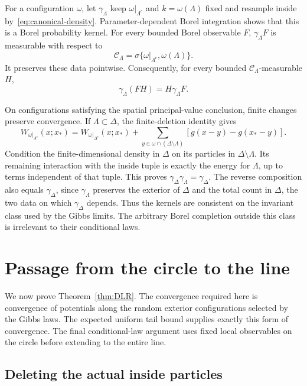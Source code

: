 \documentclass[11pt]{article}
\theoremstyle{remark}\newtheorem{remark}[theorem]{Remark}
\begin{document}
For a configuration $\omega$, let $\gamma_\Lambda$ keep
$\omega|_{\Lambda^c}$ and $k=\omega(\Lambda)$ fixed and resample
inside by~\eqref{eq:canonical-density}. Parameter-dependent Borel
integration shows that this is a Borel probability kernel. For
every bounded Borel observable $F$, $\gamma_\Lambda F$ is
measurable with respect to
\begin{equation}\label{eq:canonical-sigma}
 \mathcal C_\Lambda
   =\sigma\{\omega|_{\Lambda^c},\omega(\Lambda)\}.
\end{equation}
It preserves these data pointwise. Consequently, for every bounded
$\mathcal C_\Lambda$-measurable $H$,
\begin{equation}\label{eq:properness}
 \gamma_\Lambda(FH)=H\gamma_\Lambda F.
\end{equation}

On configurations satisfying the spatial principal-value conclusion,
finite changes preserve convergence. If $\Lambda\subset\Delta$,
the finite-deletion identity gives
\[
 W_{\omega|_{\Lambda^c}}(x;x_*)
 =W_{\omega|_{\Delta^c}}(x;x_*)
    +\sum_{y\in\omega\cap(\Delta\setminus\Lambda)}
            [g(x-y)-g(x_*-y)].
\]
Condition the finite-dimensional density in $\Delta$ on its
particles in $\Delta\setminus\Lambda$. Its remaining interaction
with the inside tuple is exactly the energy for $\Lambda$, up to
terms independent of that tuple. This proves
$\gamma_\Delta\gamma_\Lambda=\gamma_\Delta$.
The reverse composition also equals $\gamma_\Delta$, since
$\gamma_\Lambda$ preserves the exterior of $\Delta$ and the
total count in $\Delta$, the two data on which
$\gamma_\Delta$ depends. Thus the kernels are consistent on the
invariant class used by the Gibbs limits. The arbitrary Borel
completion outside this class is irrelevant to their conditional
laws.

\section{Passage from the circle to the line}\label{sec:dlr}

We now prove Theorem~\ref{thm:DLR}. The convergence required here
is convergence of potentials along the random exterior
configurations selected by the Gibbs laws. The expected uniform
tail bound supplies exactly this form of convergence. The final
conditional-law argument uses fixed local observables on the
circle before extending to the entire line.

\subsection{Deleting the actual inside particles}
\end{document}
